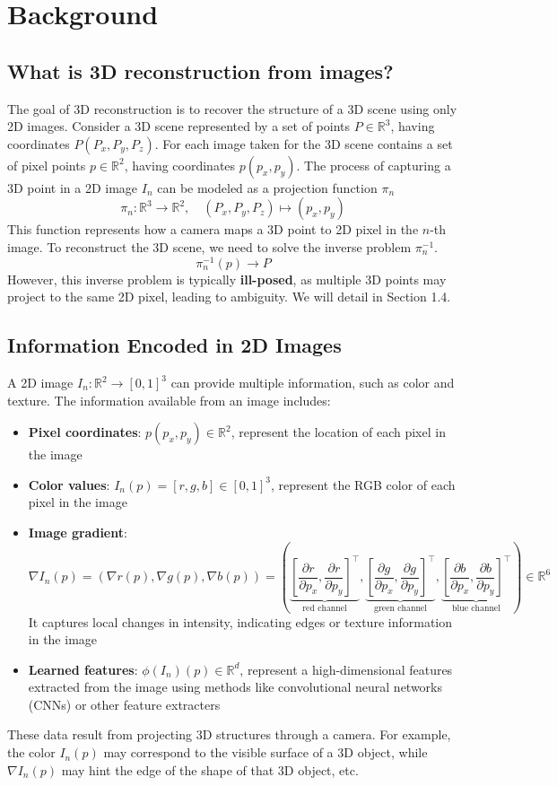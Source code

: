 \documentclass[12pt]{article}
\begin{document}
\section{Background}
\subsection{What is 3D reconstruction from images?}

The goal of 3D reconstruction is to recover the structure of a 3D scene using only 2D images.
Consider a 3D scene represented by a set of points $P \in \mathbb{R}^3$, having coordinates $P(P_x,P_y,P_z)$.
For each image taken for the 3D scene contains a set of pixel points $p \in \mathbb{R}^2$, having coordinates $p(p_x,p_y)$.
The process of capturing a 3D point in a 2D image $I_n$ can be modeled as a projection function $\pi_n$
\[
\pi_n: \mathbb{R}^3 \to \mathbb{R}^2, \quad (P_x, P_y, P_z) \mapsto (p_x, p_y)
\]
This function represents how a camera maps a 3D point to 2D pixel in the $n$-th image.
To reconstruct the 3D scene, we need to solve the inverse problem $\pi_n^{-1}$.
\[
\pi_n^{-1}(p) \to P
\]
However, this inverse problem is typically \textbf{ill-posed}, as multiple 3D points may project to the same 2D pixel, leading to ambiguity. We will detail in Section 1.4. 

\subsection{Information Encoded in 2D Images}
A 2D image $I_n: \mathbb{R}^2 \to [0,1]^3$ can provide multiple information, such as color and texture. 
The information available from an image includes:
\begin{itemize}
    \item   \textbf{Pixel coordinates}: $p(p_x,p_y) \in \mathbb{R}^2$, represent the location of each pixel in the image
    \item   \textbf{Color values}: $I_n(p) = [r,g,b] \in [0,1]^3$, represent the RGB color of each pixel in the image
    \item   \textbf{Image gradient}: 
                \[
                \nabla I_n(p) = \left( \nabla r(p), \nabla g(p), \nabla b(p) \right) = \left( \underbrace{\left[ \frac{\partial r}{\partial p_x}, \frac{\partial r}{\partial p_y} \right]^\top}_{\text{red channel}}, \underbrace{\left[ \frac{\partial g}{\partial p_x}, \frac{\partial g}{\partial p_y} \right]^\top}_{\text{green channel}}, \underbrace{\left[ \frac{\partial b}{\partial p_x}, \frac{\partial b}{\partial p_y} \right]^\top}_{\text{blue channel}} \right) \in \mathbb{R}^6
                \]
            It captures local changes in intensity, indicating edges or texture information in the image
    \item   \textbf{Learned features}: $\phi(I_n)(p) \in \mathbb{R}^d$, represent a high-dimensional features extracted from the image using methods like convolutional neural networks (CNNs) or other feature extracters
\end{itemize}
These data result from projecting 3D structures through a camera. For example, the color $I_n(p)$ may correspond to the visible surface of a 3D object, while $\nabla I_n(p)$ may hint the edge of the shape of that 3D object, etc.
\end{document}
